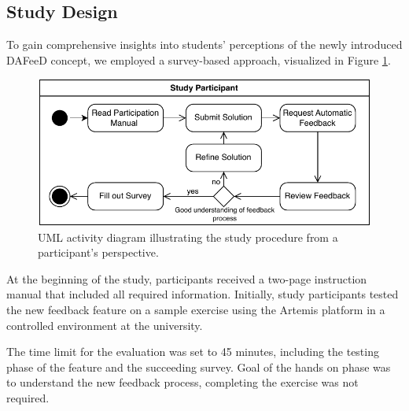 \documentclass[manuscript,screen,review]{acmart}
\begin{document}

\subsection{Study Design}
To gain comprehensive insights into students' perceptions of the newly introduced DAFeeD concept, we employed a survey-based approach, visualized in Figure \ref{fig:Study-Design}.
\begin{figure}[htbp]
  \centering
  \includegraphics[width=0.6\linewidth]{figures/Study-Design.pdf}
  \caption{UML activity diagram illustrating the study procedure from a participant's perspective.}
  \label{fig:Study-Design}
\end{figure}
At the beginning of the study, participants received a two-page instruction manual that included all required information. 
Initially, study participants tested the new feedback feature on a sample exercise using the Artemis platform in a controlled environment at the university.

The time limit for the evaluation was set to 45 minutes, including the testing phase of the feature and the succeeding survey.
Goal of the hands on phase was to understand the new feedback process, completing the exercise was not required.
\end{document}

